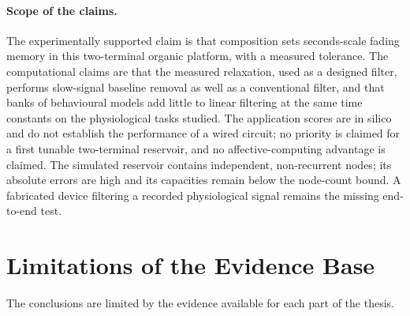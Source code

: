 \documentclass[12pt, twoside]{report}
\begin{document}
\paragraph{Scope of the claims.} The experimentally supported claim is that composition sets seconds-scale fading memory in this two-terminal organic platform, with a measured tolerance. The computational claims are that the measured relaxation, used as a designed filter, performs slow-signal baseline removal as well as a conventional filter, and that banks of behavioural models add little to linear filtering at the same time constants on the physiological tasks studied. The application scores are in silico and do not establish the performance of a wired circuit; no priority is claimed for a first tunable two-terminal reservoir, and no affective-computing advantage is claimed. The simulated reservoir contains independent, non-recurrent nodes; its absolute \NARMA{} errors are high and its capacities remain below the node-count bound. A fabricated device filtering a recorded physiological signal remains the missing end-to-end test.

\section{Limitations of the Evidence Base}\label{sec:concl_limitations}

The conclusions are limited by the evidence available for each part of the thesis.
\end{document}
